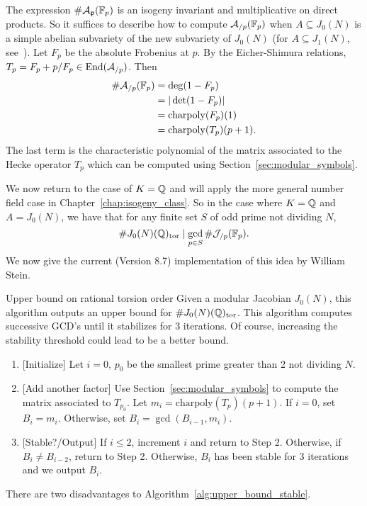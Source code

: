 The expression $\#\mathcal{A}_{\mathfrak{p}}(\mathbb{F}_p)$ is an isogeny invariant and
multiplicative on direct products. So it suffices to describe how to compute
$\mathcal{A}_{/p}(\mathbb{F}_p)$ when $A\subseteq J_0(N)$ is a simple abelian subvariety
of the new subvariety of $J_0(N)$ (for $A\subseteq J_1(N)$, see~\cite[\S
3.5]{agashe-stein:bsd}). Let $F_p$ be the absolute Frobenius at $p$. By the
Eicher-Shimura relations, $T_p = F_p + p/F_p\in \operatorname{End}(\mathcal{A}_{/p})$. Then
\begin{align}
    \label{eq:katz_bound}
    \begin{split}
    \#\mathcal{A}_{/p}(\mathbb{F}_p)
    & = \deg(1-F_p) \\
    & = |\det(1-F_p)| \\
    & = \mathrm{charpoly}(F_p)(1) \\
    & = \mathrm{charpoly}(T_p)(p+1).
    \end{split}
\end{align}
The last term is the characteristic polynomial of the matrix associated to the
Hecke operator $T_p$ which can be computed using
Section~\ref{sec:modular_symbols}.

We now return to the case of $K=\mathbb{Q}$ and will apply the more general number
field case in Chapter~\ref{chap:isogeny_class}. So in the case where $K=\mathbb{Q}$
and $A=J_0(N)$, we have that for any finite set $S$ of odd prime not dividing
$N$,
\[
    \# J_0(N)(\mathbb{Q})_{\mathrm{tor}} \mid \gcd_{p\in S} \#\mathcal{J}_{/p}(\mathbb{F}_p).
\]
We now give the current \sage (Version 8.7) implementation of this idea by
William Stein.
\begin{algorithm}{Upper bound on rational torsion order}%
    \label{alg:upper_bound_stable}
    Given a modular Jacobian $J_0(N)$, this algorithm outputs an upper bound
    for $\# J_0(N)(\mathbb{Q})_{\mathrm{tor}}$. This algorithm computes successive GCD's until
    it stabilizes for 3 iterations. Of course, increasing the stability
    threshold could lead to be a better bound.
    \begin{enumerate}
        \item{} [Initialize]
            Let $i=0$, $p_0$ be the smallest prime greater than 2 not dividing
            $N$.
        \item{} [Add another factor]
            Use Section~\ref{sec:modular_symbols} to compute the matrix
            associated to $T_{p_0}$. Let $m_i = \mathrm{charpoly}(T_p)(p+1)$.
            If $i=0$, set $B_i=m_i$. Otherwise, set $B_i=\gcd(B_{i-1}, m_i)$.
        \item{} [Stable?/Output]
            If $i\leq 2$, increment $i$ and return to Step 2. Otherwise, if
            $B_i\neq B_{i-2}$, return to Step 2. Otherwise, $B_i$ has been
            stable for 3 iterations and we output $B_i$.
    \end{enumerate}
\end{algorithm}
There are two disadvantages to Algorithm~\ref{alg:upper_bound_stable}.

